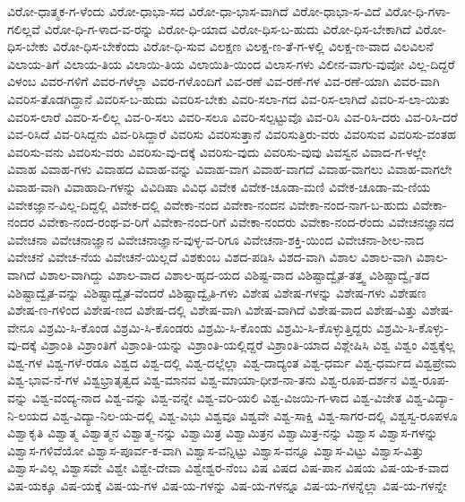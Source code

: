 ವಿರೋ-ಧಾತ್ಮಕ-ಗ-ಳೆಂದು
ವಿರೋ-ಧಾಭಾ-ಸದ
ವಿರೋ-ಧಾ-ಭಾಸ-ವಾಗಿದೆ
ವಿರೋ-ಧಾಭಾ-ಸ-ವಿದೆ
ವಿರೋ-ಧಿ-ಗಳಾ-ಗಲಿಲ್ಲವೆ
ವಿರೋ-ಧಿ-ಗ-ಳಾದ-ವ-ರನ್ನು
ವಿರೋ-ಧಿ-ಯಾದ
ವಿರೋ-ಧಿಸ-ಬ-ಹುದು
ವಿರೋ-ಧಿಸ-ಬೇಕಾಗಿದೆ
ವಿರೋ-ಧಿಸ-ಬೇಕು
ವಿರೋ-ಧಿಸ-ಬೇಕೆಂದು
ವಿರೋ-ಧಿ-ಸುವ
ವಿಲಕ್ಷಣ
ವಿಲಕ್ಷ-ಣ-ತೆ-ಗ-ಳಲ್ಲಿ
ವಿಲಕ್ಷ-ಣ-ವಾದ
ವಿಲವಿಲನೆ
ವಿಲಾಯ-ತಿಗೆ
ವಿಲಾಯ-ತಿಯ
ವಿಲಾಯಿ-ತಿಯ
ವಿಲಾಯಿತಿ-ಯಿಂದ
ವಿಲಾಸ-ಗಳು
ವಿಲೀನ-ವಾಗು-ವುವೋ
ವಿಲ್ಲ-ದಿದ್ದರೆ
ವಿಳಂಬ
ವಿವರ-ಗಳಿಗೆ
ವಿವರ-ಗಳೆಲ್ಲಾ
ವಿವರ-ಗಳೊಂದಿಗೆ
ವಿವ-ರಣೆ
ವಿವ-ರಣೆ-ಗಳ
ವಿವ-ರಣೆ-ಯಾಗಿ
ವಿವರ-ವಾಗಿ
ವಿವರಿಸ-ತೊಡಗಿದ್ದಾನೆ
ವಿವರಿಸ-ಬ-ಹುದು
ವಿವರಿಸ-ಬೇಕು
ವಿವರಿ-ಸಲಾ-ಗದ
ವಿವ-ರಿಸ-ಲಾಗಿದೆ
ವಿವರಿ-ಸ-ಲಾ-ಯಿತು
ವಿವರಿಸ-ಲಾರೆ
ವಿವರಿ-ಸ-ಲಿಲ್ಲ
ವಿವ-ರಿ-ಸಲು
ವಿವರಿ-ಸಲೂ
ವಿವರಿ-ಸಲ್ಪಟ್ಟುವೊ
ವಿವ-ರಿಸಿ
ವಿವ-ರಿಸಿ-ದರು
ವಿವ-ರಿಸಿ-ದರೆ
ವಿವ-ರಿಸಿದೆ
ವಿವ-ರಿಸಿದ್ದನು
ವಿವ-ರಿಸಿದ್ದಾರೆ
ವಿವರಿಸು
ವಿವರಿಸುತ್ತಾನೆ
ವಿವರಿಸುತ್ತಿರು-ವರು
ವಿವರಿಸುವ
ವಿವರಿಸು-ವಂತಹ
ವಿವರಿಸು-ವನು
ವಿವರಿಸು-ವರು
ವಿವರಿಸು-ವು-ದಕ್ಕೆ
ವಿವರಿಸು-ವುದು
ವಿವರಿಸು-ವುವು
ವಿವಸ್ವನ
ವಿವಾದ-ಗ-ಳಲ್ಲೇ
ವಿವಾಹ
ವಿವಾಹ-ಗಳು
ವಿವಾಹದ
ವಿವಾಹ-ವನ್ನು
ವಿವಾಹ-ವಾಗ
ವಿವಾಹ-ವಾಗದೆ
ವಿವಾಹ-ವಾಗಲು
ವಿವಾಹ-ವಾಗಲೇ
ವಿವಾಹ-ವಾಗಿ
ವಿವಾಹಾದಿ-ಗಳನ್ನು
ವಿವಿದಿಷಾ
ವಿವಿಧ
ವಿವೇಕ
ವಿವೇಕ-ಚೂಡಾ-ಮಣಿ
ವಿವೇಕ-ಚೂಡಾ-ಮ-ಣಿಯ
ವಿವೇಕಜ್ಞಾನ-ವಿಲ್ಲ-ದಿದ್ದಲ್ಲಿ
ವಿವೇಕ-ದಲ್ಲಿ
ವಿವೇಕಾ-ನಂದ
ವಿವೇಕಾ-ನಂದನ
ವಿವೇಕಾ-ನಂದ-ನಾಗ-ಬ-ಹುದು
ವಿವೇಕಾ-ನಂದರ
ವಿವೇಕಾ-ನಂದ-ರಂಥ-ವ-ರಿಗೆ
ವಿವೇಕಾ-ನಂದ-ರಿಗೆ
ವಿವೇಕಾ-ನಂದರು
ವಿವೇಕಾ-ನಂದ-ರೆಂದು
ವಿವೇಚನಜ್ಞಾನದ
ವಿವೇಚನಾ
ವಿವೇಚನಾಜ್ಞಾನ
ವಿವೇಚನಾಜ್ಞಾನ-ವುಳ್ಳ-ವ-ರಿಗೂ
ವಿವೇಚನಾ-ಶಕ್ತಿ-ಯಿಂದ
ವಿವೇಚನಾ-ಶೀಲ-ನಾದ
ವಿವೇಚನೆ
ವಿವೇಚ-ನೆಯ
ವಿವೇಚನೆ-ಯಿಲ್ಲದೆ
ವಿಶಕುಂಬ
ವಿಶದ-ಪಡಿಸಿ
ವಿಶದ-ವಾಗಿ
ವಿಶಾಲ
ವಿಶಾಲ-ವಾಗಿ
ವಿಶಾಲ-ವಾಗಿದೆ
ವಿಶಾಲ-ವಾಗಿದ್ದು
ವಿಶಾಲ-ವಾದ
ವಿಶಾಲ-ಹೃದ-ಯದ
ವಿಶಿಷ್ಟ-ವಾದ
ವಿಶಿಷ್ಟಾದ್ವೈತ-ತತ್ತ್ವ
ವಿಶಿಷ್ಟಾದ್ವೈ-ತದ
ವಿಶಿಷ್ಟಾದ್ವೈತ-ವನ್ನು
ವಿಶಿಷ್ಟಾದ್ವೈತ-ವೆಂದರೆ
ವಿಶಿಷ್ಟಾದ್ವೈತಿ-ಗಳು
ವಿಶೇಷ
ವಿಶೇಷ-ಗಳನ್ನು
ವಿಶೇಷ-ಗಳು
ವಿಶೇಷಣ
ವಿಶೇಷ-ಣ-ಗಳಿಂದ
ವಿಶೇಷ-ಣದ
ವಿಶೇಷ-ದಲ್ಲಿ
ವಿಶೇಷ-ವಾಗಿ
ವಿಶೇಷ-ವಾಗಿದೆ
ವಿಶೇಷ-ವಾದ
ವಿಶೇಷ-ವಿತ್ತು
ವಿಶೇಷ-ವೇನೂ
ವಿಶ್ರಮಿ-ಸಿ-ಕೊಂಡ
ವಿಶ್ರಮಿ-ಸಿ-ಕೊಂಡರು
ವಿಶ್ರಮಿ-ಸಿ-ಕೊಂಡು
ವಿಶ್ರಮಿ-ಸಿ-ಕೊಳ್ಳುತ್ತಿದ್ದರು
ವಿಶ್ರಮಿ-ಸಿ-ಕೊಳ್ಳು-ವು-ದಕ್ಕೆ
ವಿಶ್ರಾಂತಿ
ವಿಶ್ರಾಂತಿಗೆ
ವಿಶ್ರಾಂತಿ-ಯನ್ನು
ವಿಶ್ರಾಂತಿ-ಯಲ್ಲಿದ್ದರೆ
ವಿಶ್ರಾಂತಿ-ಯಾದ
ವಿಶ್ಲೇಷಿಸಿ
ವಿಶ್ವ
ವಿಶ್ವಂ
ವಿಶ್ವಕ್ಕೆಲ್ಲ
ವಿಶ್ವ-ಗಳ
ವಿಶ್ವ-ಗಳೆ-ರಡೂ
ವಿಶ್ವದ
ವಿಶ್ವ-ದಲ್ಲಿ
ವಿಶ್ವ-ದಲ್ಲೆಲ್ಲಾ
ವಿಶ್ವ-ದಾದ್ಯಂತ
ವಿಶ್ವ-ಧರ್ಮ
ವಿಶ್ವ-ಧರ್ಮದ
ವಿಶ್ವಪ್ರೇಮ
ವಿಶ್ವ-ಭಾವ-ನೆ-ಗಳ
ವಿಶ್ವಭ್ರಾತೃತ್ವದ
ವಿಶ್ವ-ಮಾನವ
ವಿಶ್ವ-ಮಾಯಾ-ಧೀಶ-ನಾ-ತನು
ವಿಶ್ವ-ರೂಪ-ದರ್ಶನ
ವಿಶ್ವ-ರೂಪ-ವನ್ನು
ವಿಶ್ವ-ವಂದ್ಯ-ನಾದ
ವಿಶ್ವ-ವನ್ನು
ವಿಶ್ವ-ವನ್ನೇ
ವಿಶ್ವ-ವರಿ-ಯಲಿ
ವಿಶ್ವ-ವಿಜಯಿ-ಗ-ಳಾದ
ವಿಶ್ವ-ವಿಜೇತ
ವಿಶ್ವ-ವಿದ್ಯಾ-ನಿ-ಲಯದ
ವಿಶ್ವ-ವಿದ್ಯಾ-ನಿಲ-ಯ-ದಲ್ಲಿ
ವಿಶ್ವ-ವಿಭು
ವಿಶ್ವವೂ
ವಿಶ್ವವೇ
ವಿಶ್ವ-ಸಾಕ್ಷಿ
ವಿಶ್ವ-ಸಾಗರ-ದಲ್ಲಿ
ವಿಶ್ವಸ್ವ-ರೂಪಳೂ
ವಿಶ್ವಾಕೃತಿ
ವಿಶ್ವಾತ್ಮ
ವಿಶ್ವಾತ್ಮನ
ವಿಶ್ವಾತ್ಮ-ನನ್ನು
ವಿಶ್ವಾಮಿತ್ರ
ವಿಶ್ವಾಮಿತ್ರನ
ವಿಶ್ವಾಮಿತ್ರ-ನನ್ನು
ವಿಶ್ವಾಸ
ವಿಶ್ವಾಸ-ಗಳನ್ನು
ವಿಶ್ವಾಸ-ಗಳಿವೆಯೋ
ವಿಶ್ವಾಸ-ಪೂರ್ವ-ಕ-ವಾಗಿ
ವಿಶ್ವಾಸ-ವನ್ನಿಟ್ಟು
ವಿಶ್ವಾಸ-ವನ್ನೂ
ವಿಶ್ವಾಸ-ವಿಟ್ಟು
ವಿಶ್ವಾಸ-ವಿತ್ತು
ವಿಶ್ವಾಸ-ವಿಲ್ಲ
ವಿಶ್ವಾಸವೇ
ವಿಶ್ವೇ
ವಿಶ್ವೇ-ದೇವಾ
ವಿಶ್ವೇಶ್ವರ-ನೆಂಬ
ವಿಷ
ವಿಷದ
ವಿಷ-ಪಾನ
ವಿಷಯ
ವಿಷ-ಯ-ಕ-ವಾದ
ವಿಷ-ಯಕ್ಕೂ
ವಿಷ-ಯಕ್ಕೆ
ವಿಷ-ಯ-ಗಳ
ವಿಷ-ಯ-ಗಳನ್ನು
ವಿಷ-ಯ-ಗಳನ್ನೂ
ವಿಷ-ಯ-ಗಳನ್ನೆಲ್ಲಾ
ವಿಷ-ಯ-ಗಳನ್ನೇ
